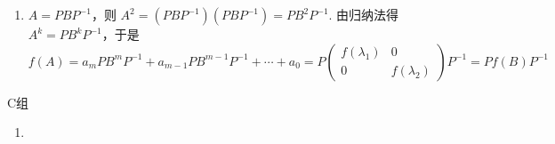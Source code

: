 \begin{enumerate}
\begin{enumerate}
        \item $A=PBP^{-1}$，则 $A^2=(PBP^{-1})(PBP^{-1})=PB^2P^{-1}$. 由归纳法得 $A^k=PB^kP^{-1}$，于是
        \[f(A)=a_mPB^mP^{-1}+a_{m-1}PB^{m-1}P^{-1}+\cdots+a_0=P\begin{pmatrix}f(\lambda_1) & 0 \\ 0 & f(\lambda_2)\end{pmatrix}P^{-1}=Pf(B)P^{-1}\]
    \end{enumerate}
\end{enumerate}

\centerline{\heiti C组}
\begin{enumerate}
    \item
\end{enumerate}

\clearpage
